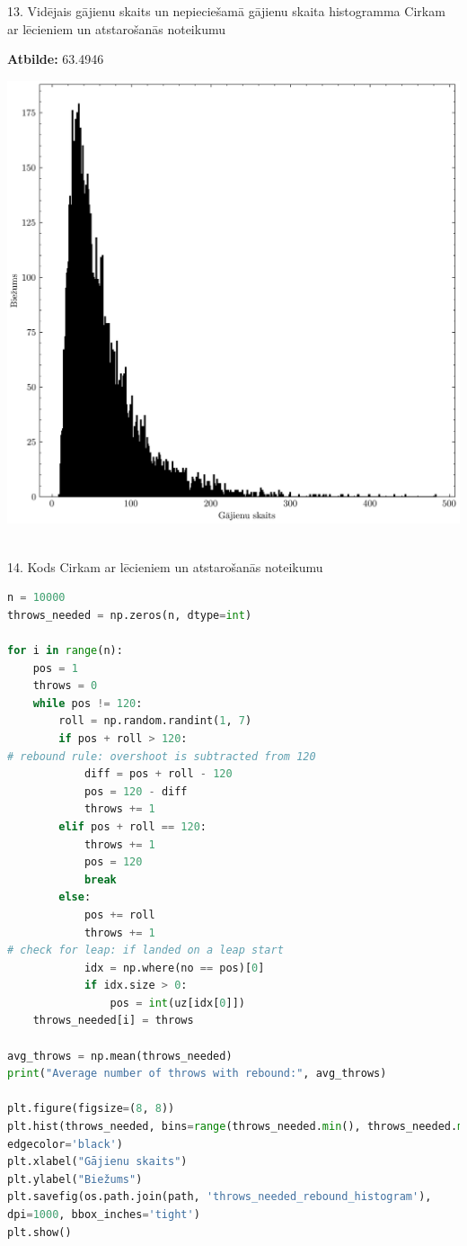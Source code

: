 \documentclass[12pt]{article}
\begin{document}
13. Vidējais gājienu skaits un nepieciešamā gājienu skaita histogramma Cirkam ar lēcieniem un atstarošanās noteikumu

\textbf{Atbilde:} 63.4946

\begin{center}
    \includegraphics[width=0.8\linewidth]{throws_needed_rebound_histogram.png}
\end{center}

\\

14.	Kods Cirkam ar lēcieniem un atstarošanās noteikumu

\begin{lstlisting}[language=Python]
n = 10000
throws_needed = np.zeros(n, dtype=int)

for i in range(n):
    pos = 1
    throws = 0
    while pos != 120:
        roll = np.random.randint(1, 7)
        if pos + roll > 120:
# rebound rule: overshoot is subtracted from 120
            diff = pos + roll - 120
            pos = 120 - diff
            throws += 1
        elif pos + roll == 120:
            throws += 1
            pos = 120
            break
        else:
            pos += roll
            throws += 1
# check for leap: if landed on a leap start
            idx = np.where(no == pos)[0]
            if idx.size > 0:
                pos = int(uz[idx[0]])
    throws_needed[i] = throws

avg_throws = np.mean(throws_needed)
print("Average number of throws with rebound:", avg_throws)

plt.figure(figsize=(8, 8))
plt.hist(throws_needed, bins=range(throws_needed.min(), throws_needed.max()+2),
edgecolor='black')
plt.xlabel("Gājienu skaits")
plt.ylabel("Biežums")
plt.savefig(os.path.join(path, 'throws_needed_rebound_histogram'),
dpi=1000, bbox_inches='tight')
plt.show()
\end{lstlisting}
\end{document}

